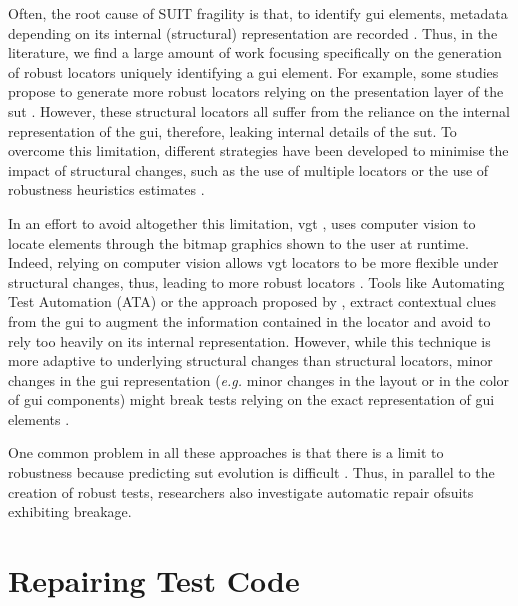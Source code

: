 Often, the root cause of SUIT fragility is that, to identify \gls{gui} elements, metadata depending on its internal (structural) representation are recorded \cite{Daniel2011, Yandrapally2014, Hammoudi2016}. Thus, in the literature, we find a large amount of work focusing specifically on the generation of robust locators uniquely identifying a \gls{gui} element. For example, some studies propose to generate more robust locators relying on the presentation  layer  of the \gls{sut} \cite{Montoto2011, Leotta2014, Leotta2015, Leotta2016, Zheng2018}. However, these structural locators all suffer from the reliance on the internal representation of the \gls{gui}, therefore, leaking internal details of the \gls{sut}. To overcome this limitation, different strategies have been developed to minimise the impact of structural changes, such as the use of multiple locators \cite{Leotta2015, Zheng2018, Long2020} or the use of robustness heuristics estimates \cite{Montoto2011, Leotta2014, Leotta2015, Leotta2015b}.

In an effort to avoid altogether this limitation, \gls{vgt} \cite{Bosch2014}, uses computer vision to locate elements through the bitmap graphics shown to the user at runtime. Indeed, relying on computer vision allows \gls{vgt} locators to be more flexible under structural changes, thus, leading to more robust locators \cite{Leotta2014b}. Tools like  Automating Test Automation (ATA) \cite{Thummalapenta2012, Thummalapenta2013} or the approach proposed by \textcite{Yandrapally2014}, extract contextual clues from the \gls{gui} to augment the information contained in the locator and avoid to rely too heavily on its internal representation. However, while this technique is more adaptive to underlying structural changes than structural locators, minor changes in the \gls{gui} representation (\emph{e.g.} minor changes in the layout or in the color of \gls{gui} components) might break tests relying on the exact representation of \gls{gui} elements \cite{Aldalur2017, Alegroth2018}.

One common problem in all these approaches is that there is a limit to robustness because predicting \gls{sut} evolution is difficult \cite{Kirinuki2019}. Thus, in parallel to the creation of robust tests, researchers also investigate automatic repair of\gls{suit}s exhibiting breakage.

\section{Repairing Test Code}
\label{sec:related-repair}

